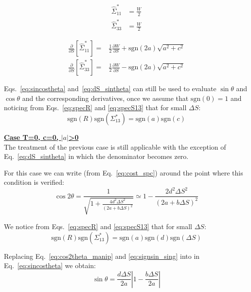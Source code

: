 \begin{align}
\hat{\Sigma}^*_{11} &= \frac{W}{2}\\
\hat{\Sigma}^*_{33} &= \frac{W}{2}
\end{align}

\begin{align}
\frac{\partial }{\partial S} \left[\hat{\Sigma}^*_{11} \right] =& \frac{1}{2}\frac{\partial W }{\partial S}
+ \mathrm{sgn}(2a)\sqrt{a^2 + c^2 }
\\
\frac{\partial }{\partial S} \left[\hat{\Sigma}^*_{33} \right] =&\frac{1}{2}\frac{\partial W }{\partial S}
- \mathrm{sgn}(2a)\sqrt{a^2 + c^2 }
\end{align}

Eqs.~\ref{eq:sincostheta} and~\ref{eq:dS_sintheta} can still be used to evaluate $\sin \theta$ and $\cos \theta$ and the corresponding derivatives, once we assume that $\mathrm{sgn}(0) = 1$ and noticing from Eqs.~\ref{eq:specR} and \ref{eq:specS13} that for small $\Delta S$:
\begin{equation}
\mathrm{sgn}(R)\mathrm{sgn}(\Sigma^*_{13}) = \mathrm{sgn}(a)\mathrm{sgn}(c)
\end{equation}


\textbf{\underline{Case T=0, c=0, $\left| a \right|$>0}}
~\\

The treatment of the previous case is still applicable with the exception of Eq.~\ref{eq:dS_sintheta} in which the denominator becomes zero.

For this case we can write (from Eq.~\ref{eq:cost_spc}) around the point where this condition is verified:
\begin{equation}
\cos 2\theta =  \frac{1}{\sqrt{1+\frac{4d^2 \Delta S^2}{\left(2a +b \Delta S\right)^2}}} \simeq  
1-\frac{2d^2 \Delta S^2}{\left(2a +b \Delta S\right)^2}
\label{eq:cos2theta_manip}
\end{equation}

We notice from Eqs.~\ref{eq:specR} and \ref{eq:specS13} that for small $\Delta S$:
\begin{equation}
\mathrm{sgn}(R)\mathrm{sgn}(\Sigma^*_{13}) = \mathrm{sgn}(a)\mathrm{sgn}(d)\mathrm{sgn}(\Delta S)\label{eq:signsin_sing}
\end{equation}

Replacing Eq.~\ref{eq:cos2theta_manip} and \ref{eq:signsin_sing} into in Eq.~\ref{eq:sincostheta}
we obtain:
\begin{equation}
\sin\theta =  \frac{d\Delta S}{2a} \left| 1 - \frac{b \Delta S}{2a}\right|
\end{equation}

